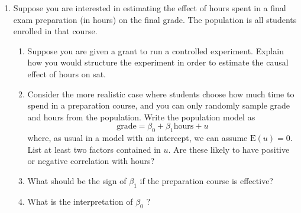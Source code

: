 \documentclass[12pt]{article}
\begin{document}
\begin{enumerate}
{We can express \( u \) as:
\[
u = \alpha_0 + \tilde{u},
\]
where \( \tilde{u} \) is a new error term with \( \mathrm{E}(\tilde{u}) = 0 \). Notice that \( \tilde{u} = u - \alpha_0 \) by construction.

Step 3: Substitute \( u = \alpha_0 + \tilde{u} \) into the Original Model:

Substituting into the original equation gives:
\[
y = \beta_0 + \beta_1 x + u = \beta_0 + \beta_1 x + \alpha_0 + \tilde{u}.
\]

Step 4: Rearrange the Model:

We can now rewrite the model as:
\[
y = (\beta_0 + \alpha_0) + \beta_1 x + \tilde{u}.
\]

Let the new intercept be:
\[
\beta_0' = \beta_0 + \alpha_0.
\]

So the model becomes:
\[
y = \beta_0' + \beta_1 x + \tilde{u},
\]
where \( \tilde{u} \) is the new error term.

Step 5: Verify the Expected Value of the New Error Term:

By construction, \( \tilde{u} = u - \alpha_0 \), and:
\[
\mathrm{E}(\tilde{u}) = \mathrm{E}(u - \alpha_0) = \mathrm{E}(u) - \alpha_0 = \alpha_0 - \alpha_0 = 0.
\]

Conclusion:

The model has the same slope \( \beta_1 \), but a new intercept \( \beta_0' = \beta_0 + \alpha_0 \), and the new error term \( \tilde{u} \) has an expected value of zero \( \mathrm{E}(\tilde{u}) = 0 \).


}


\item Suppose you are interested in estimating the effect of hours spent in a final exam preparation  (in hours) on the final grade. The population is all students enrolled in that course. 
\begin{enumerate}
    \item Suppose you are given a grant to run a controlled experiment. Explain how you would structure the experiment in order to estimate the causal effect of hours on sat.
    \item Consider the more realistic case where students choose how much time to spend in a preparation course, and you can only randomly sample grade and hours from the population. Write the population model as
$$
\text {grade}=\beta_0+\beta_1 \text {hours}+u
$$
where, as usual in a model with an intercept, we can assume $\mathrm{E}(u)=0$. List at least two factors contained in $u$. Are these likely to have positive or negative correlation with hours?
\item What should be the sign of $\beta_1$ if the preparation course is effective?
\item What is the interpretation of $\beta_0$ ?
\end{enumerate}



\end{enumerate}
\end{document}
